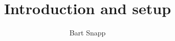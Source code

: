 \documentclass{ximera}
\title{Introduction and setup}
\author{Bart Snapp}
\begin{document}
\begin{abstract}
\end{abstract}
\maketitle
\end{document}
